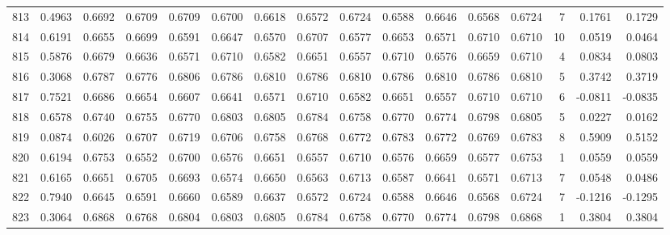 \begin{tabular}{lrrrrrrrrrrrrrrr}
813 &      0.4963 &  0.6692 &  0.6709 &  0.6709 &  0.6700 &  0.6618 &  0.6572 &  0.6724 &  0.6588 &  0.6646 &   0.6568 &     0.6724 &      7 &                    0.1761 &                     0.1729 \\
814 &      0.6191 &  0.6655 &  0.6699 &  0.6591 &  0.6647 &  0.6570 &  0.6707 &  0.6577 &  0.6653 &  0.6571 &   0.6710 &     0.6710 &     10 &                    0.0519 &                     0.0464 \\
815 &      0.5876 &  0.6679 &  0.6636 &  0.6571 &  0.6710 &  0.6582 &  0.6651 &  0.6557 &  0.6710 &  0.6576 &   0.6659 &     0.6710 &      4 &                    0.0834 &                     0.0803 \\
816 &      0.3068 &  0.6787 &  0.6776 &  0.6806 &  0.6786 &  0.6810 &  0.6786 &  0.6810 &  0.6786 &  0.6810 &   0.6786 &     0.6810 &      5 &                    0.3742 &                     0.3719 \\
817 &      0.7521 &  0.6686 &  0.6654 &  0.6607 &  0.6641 &  0.6571 &  0.6710 &  0.6582 &  0.6651 &  0.6557 &   0.6710 &     0.6710 &      6 &                   -0.0811 &                    -0.0835 \\
818 &      0.6578 &  0.6740 &  0.6755 &  0.6770 &  0.6803 &  0.6805 &  0.6784 &  0.6758 &  0.6770 &  0.6774 &   0.6798 &     0.6805 &      5 &                    0.0227 &                     0.0162 \\
819 &      0.0874 &  0.6026 &  0.6707 &  0.6719 &  0.6706 &  0.6758 &  0.6768 &  0.6772 &  0.6783 &  0.6772 &   0.6769 &     0.6783 &      8 &                    0.5909 &                     0.5152 \\
820 &      0.6194 &  0.6753 &  0.6552 &  0.6700 &  0.6576 &  0.6651 &  0.6557 &  0.6710 &  0.6576 &  0.6659 &   0.6577 &     0.6753 &      1 &                    0.0559 &                     0.0559 \\
821 &      0.6165 &  0.6651 &  0.6705 &  0.6693 &  0.6574 &  0.6650 &  0.6563 &  0.6713 &  0.6587 &  0.6641 &   0.6571 &     0.6713 &      7 &                    0.0548 &                     0.0486 \\
822 &      0.7940 &  0.6645 &  0.6591 &  0.6660 &  0.6589 &  0.6637 &  0.6572 &  0.6724 &  0.6588 &  0.6646 &   0.6568 &     0.6724 &      7 &                   -0.1216 &                    -0.1295 \\
823 &      0.3064 &  0.6868 &  0.6768 &  0.6804 &  0.6803 &  0.6805 &  0.6784 &  0.6758 &  0.6770 &  0.6774 &   0.6798 &     0.6868 &      1 &                    0.3804 &                     0.3804 \\

\end{tabular}
